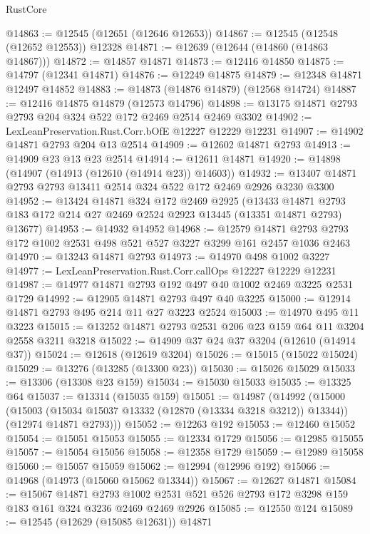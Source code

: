 \begin{lexlean}{RustCore}
\begin{coremodule}
@14863 := @12545 (@12651 (@12646 @12653))
@14867 := @12545 (@12548 (@12652 @12553)) @12328
@14871 := @12639 (@12644 (@14860 (@14863 @14867)))
@14872 := @14857 @14871
@14873 := @12416 @14850
@14875 := @14797 (@12341 @14871)
@14876 := @12249 @14875
@14879 := @12348 @14871 @12497 @14852
@14883 := @14873 (@14876 @14879) (@12568 @14724)
@14887 := @12416 @14875 @14879 (@12573 @14796)
@14898 := @13175 @14871 @2793 @2793 @204 @324 @522 @172 @2469 @2514 @2469 @3302
@14902 := LexLeanPreservation.Rust.Corr.bOfE @12227 @12229 @12231
@14907 := @14902 @14871 @2793 @204 @13 @2514
@14909 := @12602 @14871 @2793
@14913 := @14909 @23 @13 @23 @2514
@14914 := @12611 @14871
@14920 := @14898 (@14907 (@14913 (@12610 (@14914 @23)) @14603))
@14932 := @13407 @14871 @2793 @2793 @13411 @2514 @324 @522 @172 @2469 @2926 @3230 @3300
@14952 := @13424
    @14871
    @324
    @172
    @2469
    @2925
    (@13433 @14871 @2793 @183 @172 @214 @27 @2469 @2524 @2923 @13445 (@13351 @14871 @2793) @13677)
@14953 := @14932 @14952
@14968 := @12579
    @14871
    @2793
    @2793
    @172
    @1002
    @2531
    @498
    @521
    @527
    @3227
    @3299
    @161
    @2457
    @1036
    @2463
@14970 := @13243 @14871 @2793
@14973 := @14970 @498 @1002 @3227
@14977 := LexLeanPreservation.Rust.Corr.callOps @12227 @12229 @12231
@14987 := @14977 @14871 @2793 @192 @497 @40 @1002 @2469 @3225 @2531 @1729
@14992 := @12905 @14871 @2793 @497 @40 @3225
@15000 := @12914 @14871 @2793 @495 @214 @11 @27 @3223 @2524
@15003 := @14970 @495 @11 @3223
@15015 := @13252 @14871 @2793 @2531 @206 @23 @159 @64 @11 @3204 @2558 @3211 @3218
@15022 := @14909 @37 @24 @37 @3204 (@12610 (@14914 @37))
@15024 := @12618 (@12619 @3204)
@15026 := @15015 (@15022 @15024)
@15029 := @13276 (@13285 (@13300 @23))
@15030 := @15026 @15029
@15033 := @13306 (@13308 @23 @159)
@15034 := @15030 @15033
@15035 := @13325 @64
@15037 := @13314 (@15035 @159)
@15051 := @14987
    (@14992
      (@15000
        (@15003 (@15034 @15037 @13332 (@12870 (@13334 @3218 @3212)) @13344))
        (@12974 @14871 @2793)))
@15052 := @12263 @192
@15053 := @12460 @15052
@15054 := @15051 @15053
@15055 := @12334 @1729
@15056 := @12985 @15055
@15057 := @15054 @15056
@15058 := @12358 @1729
@15059 := @12989 @15058
@15060 := @15057 @15059
@15062 := @12994 (@12996 @192)
@15066 := @14968 (@14973 (@15060 @15062 @13344))
@15067 := @12627 @14871
@15084 := @15067
    @14871
    @2793
    @1002
    @2531
    @521
    @526
    @2793
    @172
    @3298
    @159
    @183
    @161
    @324
    @3236
    @2469
    @2469
    @2926
@15085 := @12550 @124
@15089 := @12545 (@12629 (@15085 @12631)) @14871

\end{coremodule}
\end{lexlean}
